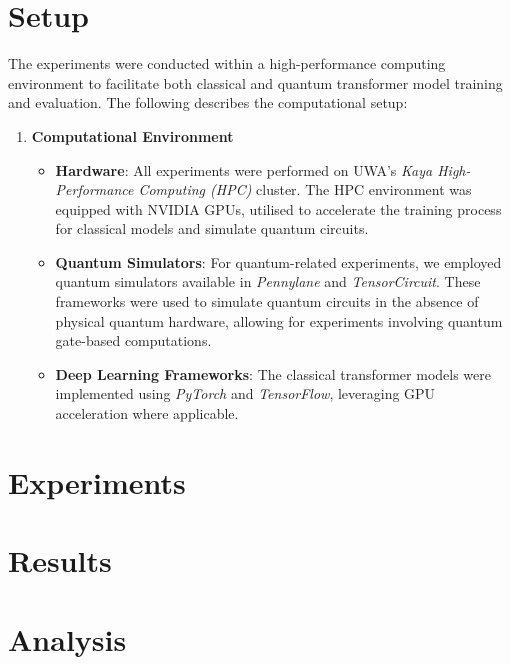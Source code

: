 \section{Setup}
\label{sec:setup}
The experiments were conducted within a high-performance computing
environment to facilitate both classical and quantum transformer
model training and evaluation. The following describes the computational setup:

\begin{enumerate}
  \item \textbf{Computational Environment}
        \begin{itemize}
          \item \textbf{Hardware}: All experiments were performed on
                UWA’s \textit{Kaya High-Performance Computing (HPC)} cluster.
                The HPC environment was equipped with NVIDIA GPUs, utilised
                to accelerate the training process for classical models and
                simulate quantum circuits.
          \item \textbf{Quantum Simulators}: For quantum-related
                experiments, we employed quantum simulators available in
                \textit{Pennylane} and \textit{TensorCircuit}. These
                frameworks were used to simulate quantum circuits in the
                absence of physical quantum hardware, allowing for
                experiments involving quantum gate-based computations.
          \item \textbf{Deep Learning Frameworks}: The classical
                transformer models were implemented using \textit{PyTorch}
                and \textit{TensorFlow}, leveraging GPU acceleration where applicable.
        \end{itemize}
\end{enumerate}

\section{Experiments}
\label{sec:experiments}

\section{Results}
\label{sec:results}

\section{Analysis}
\label{sec:analysis}
